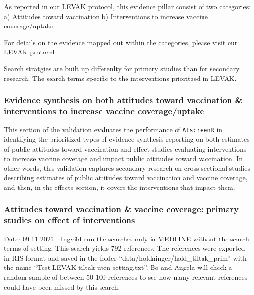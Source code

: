 \documentclass[
  letterpaper,
  DIV=11,
  numbers=noendperiod]{scrartcl}
\begin{document}
As reported in our \href{https://osf.io/pmut5/overview}{LEVAK protocol},
this evidence pillar consist of two categories: a) Attitudes toward
vaccination b) Interventions to increase vaccine coverage/uptake

For details on the evidence mapped out within the categories, please
visit our \href{https://osf.io/pmut5/overview}{LEVAK protocol}.

Search stratgies are built up differenlty for primary studies than for
secondary research. The search terms specific to the interventions
prioritzed in LEVAK.

\subsubsection{Evidence synthesis on both attitudes toward vaccination
\& interventions to increase vaccine
coverage/uptake}\label{evidence-synthesis-on-both-attitudes-toward-vaccination-interventions-to-increase-vaccine-coverageuptake}

This section of the validation evaluates the performance of
\texttt{AIscreenR} in identifying the prioritized types of evidence
synthesis reporting on both estimates of public attitudes toward
vaccination and effect studies evaluating interventions to increase
vaccine coverage and impact public attitudes toward vaccination. In
other words, this validation captures secondary research on
cross-sectional studies describing estimates of public attitudes toward
vaccination and vaccine coverage, and then, in the effects section, it
covers the interventions that impact them.

\subsubsection{Attitudes toward vaccination \& vaccine coverage: primary
studies on effect of
interventions}\label{attitudes-toward-vaccination-vaccine-coverage-primary-studies-on-effect-of-interventions}

Date: 09.11.2026 - Ingvild run the searches only in MEDLINE without the
search terms of setting. This search yields 792 references. The
references were exported in RIS format and saved in the folder
``data/holdninger/hold\_tiltak\_prim'' with the name ``Test LEVAK tiltak
uten setting.txt''. Bo and Angela will check a random sample of between
50-100 references to see how many relevant references could have been
missed by this search.
\end{document}
